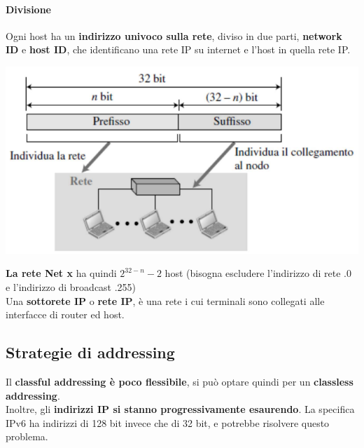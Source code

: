 \documentclass[10pt]{article}
\begin{document}
\paragraph{Divisione} Ogni host ha un \textbf{indirizzo univoco sulla rete}, diviso in due parti, \textbf{network ID} e \textbf{host ID}, che identificano una rete IP su internet e l'host in quella rete IP.
\begin{center}
\includegraphics[scale=0.6]{ipnethostid.png}
\end{center}
\textbf{La rete Net x} ha quindi $2^{32-n} - 2$ host (bisogna escludere l'indirizzo di rete .0 e l'indirizzo di broadcast .255)\\
Una \textbf{sottorete IP} o \textbf{rete IP}, è una rete i cui terminali sono collegati alle interfacce di router ed host.
\subsection{Strategie di addressing}
Il \textbf{classful addressing è poco flessibile}, si può optare quindi per un \textbf{classless addressing}.\\
Inoltre, gli \textbf{indirizzi IP si stanno progressivamente esaurendo}. La specifica IPv6 ha indirizzi di 128 bit invece che di 32 bit, e potrebbe risolvere questo problema.
\pagebreak
\end{document}
